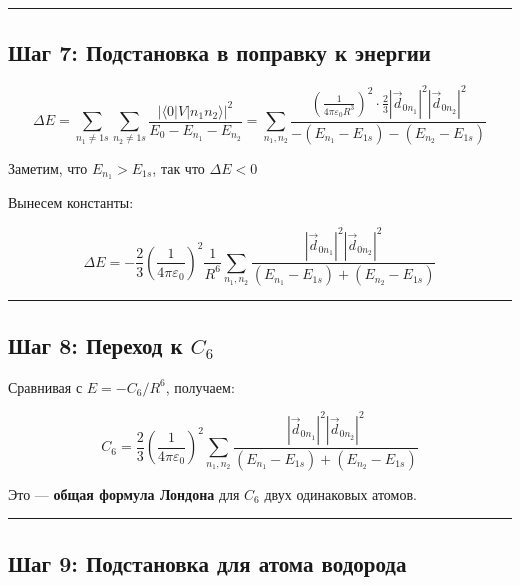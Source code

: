 \documentclass[11pt]{article}
\begin{document}
\begin{center}\rule{0.5\linewidth}{\linethickness}\end{center}

\subsection{Шаг 7: Подстановка в поправку к
энергии}\label{ux448ux430ux433-7-ux43fux43eux434ux441ux442ux430ux43dux43eux432ux43aux430-ux432-ux43fux43eux43fux440ux430ux432ux43aux443-ux43a-ux44dux43dux435ux440ux433ux438ux438}

\[
\Delta E = \sum_{n_1 \neq 1s} \sum_{n_2 \neq 1s} \frac{ |\langle 0 | V | n_1 n_2 \rangle|^2 }{E_0 - E_{n_1} - E_{n_2}}
= \sum_{n_1, n_2} \frac{ \left( \frac{1}{4\pi\varepsilon_0 R^3} \right)^2 \cdot \frac{2}{3} |\vec{d}_{0n_1}|^2 |\vec{d}_{0n_2}|^2 }{ - (E_{n_1} - E_{1s}) - (E_{n_2} - E_{1s}) }
\]

Заметим, что \(E_{n_1} > E_{1s}\), так что \(\Delta E < 0\)

Вынесем константы:

\[
\Delta E = -\frac{2}{3} \left( \frac{1}{4\pi\varepsilon_0} \right)^2 \frac{1}{R^6} \sum_{n_1, n_2} \frac{ |\vec{d}_{0n_1}|^2 |\vec{d}_{0n_2}|^2 }{ (E_{n_1} - E_{1s}) + (E_{n_2} - E_{1s}) }
\]

\begin{center}\rule{0.5\linewidth}{\linethickness}\end{center}

\subsection{\texorpdfstring{Шаг 8: Переход к
\(C_6\)}{Шаг 8: Переход к C\_6}}\label{ux448ux430ux433-8-ux43fux435ux440ux435ux445ux43eux434-ux43a-c_6}

Сравнивая с \(E = -C_6 / R^6\), получаем:

\[
C_6 = \frac{2}{3} \left( \frac{1}{4\pi\varepsilon_0} \right)^2 \sum_{n_1, n_2} \frac{ |\vec{d}_{0n_1}|^2 |\vec{d}_{0n_2}|^2 }{ (E_{n_1} - E_{1s}) + (E_{n_2} - E_{1s}) }
\]

Это --- \textbf{общая формула Лондона} для \(C_6\) двух одинаковых
атомов.

\begin{center}\rule{0.5\linewidth}{\linethickness}\end{center}

\subsection{Шаг 9: Подстановка для атома
водорода}\label{ux448ux430ux433-9-ux43fux43eux434ux441ux442ux430ux43dux43eux432ux43aux430-ux434ux43bux44f-ux430ux442ux43eux43cux430-ux432ux43eux434ux43eux440ux43eux434ux430}
\end{document}
